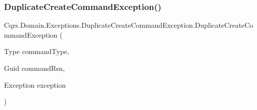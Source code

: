 \subsubsection{\texorpdfstring{Duplicate\+Create\+Command\+Exception()}{DuplicateCreateCommandException()}\hspace{0.1cm}{\footnotesize\ttfamily [3/3]}}
{\footnotesize\ttfamily Cqrs.\+Domain.\+Exceptions.\+Duplicate\+Create\+Command\+Exception.\+Duplicate\+Create\+Command\+Exception (\begin{DoxyParamCaption}\item[{Type}]{command\+Type,  }\item[{Guid}]{command\+Rsn,  }\item[{Exception}]{exception }\end{DoxyParamCaption})}

